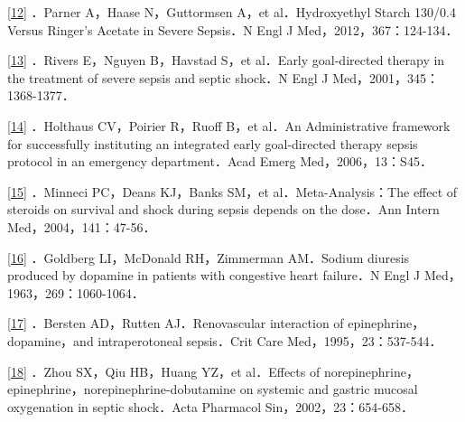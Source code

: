 \protect\hyperlink{text00008.htmlux5cux23ch12-7-back}{{[}12{]}} ．Parner
A，Haase N，Guttormsen A，et al．Hydroxyethyl Starch 130/0.4 Versus
Ringer's Acetate in Severe Sepsis．N Engl J Med，2012，367：124-134．

\protect\hyperlink{text00008.htmlux5cux23ch13-7-back}{{[}13{]}} ．Rivers
E，Nguyen B，Havstad S，et al．Early goal-directed therapy in the
treatment of severe sepsis and septic shock．N Engl J
Med，2001，345：1368-1377．

\protect\hyperlink{text00008.htmlux5cux23ch14-7-back}{{[}14{]}}
．Holthaus CV，Poirier R，Ruoff B，et al．An Administrative framework
for successfully instituting an integrated early goal-directed therapy
sepsis protocol in an emergency department．Acad Emerg
Med，2006，13：S45．

\protect\hyperlink{text00008.htmlux5cux23ch15-7-back}{{[}15{]}}
．Minneci PC，Deans KJ，Banks SM，et al．Meta-Analysis：The effect of
steroids on survival and shock during sepsis depends on the dose．Ann
Intern Med，2004，141：47-56．

\protect\hyperlink{text00008.htmlux5cux23ch16-7-back}{{[}16{]}}
．Goldberg LI，McDonald RH，Zimmerman AM．Sodium diuresis produced by
dopamine in patients with congestive heart failure．N Engl J
Med，1963，269：1060-1064．

\protect\hyperlink{text00008.htmlux5cux23ch17-7-back}{{[}17{]}}
．Bersten AD，Rutten AJ．Renovascular interaction of
epinephrine，dopamine，and intraperotoneal sepsis．Crit Care
Med，1995，23：537-544．

\protect\hyperlink{text00008.htmlux5cux23ch18-7-back}{{[}18{]}} ．Zhou
SX，Qiu HB，Huang YZ，et al．Effects of
norepinephrine，epinephrine，norepinephrine-dobutamine on systemic and
gastric mucosal oxygenation in septic shock．Acta Pharmacol
Sin，2002，23：654-658．

\protect\hypertarget{text00009.html}{}{}

